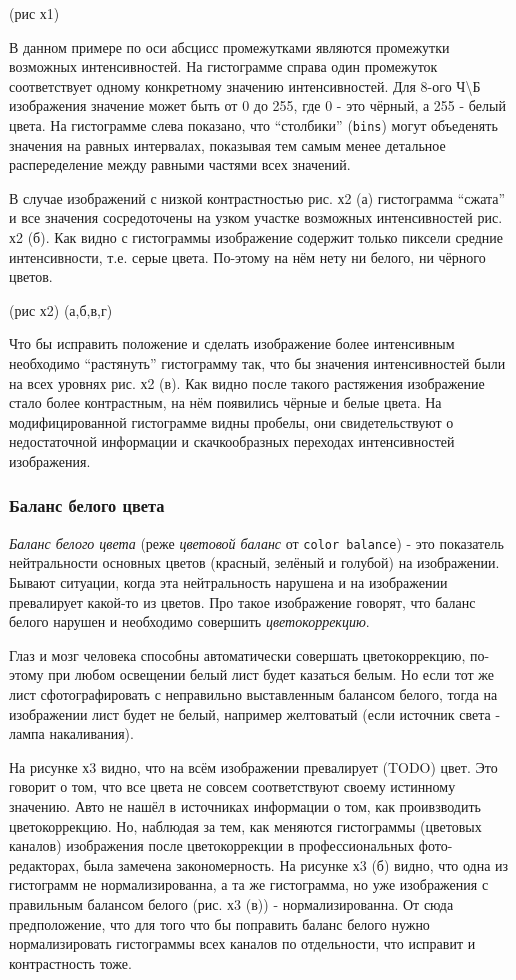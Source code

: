 \documentclass[12pt]{report}
\begin{document}
(рис х1)

В данном примере по оси абсцисс промежутками являются промежутки возможных интенсивностей. На гистограмме справа один промежуток соответствует одному конкретному значению интенсивностей. Для 8-ого Ч\textbackslash{}Б изображения значение может быть от 0 до 255, где 0 - это чёрный, а 255 - белый цвета. На гистограмме слева показано, что ``столбики'' (\texttt{bins}) могут объеденять значения на равных интервалах, показывая тем самым менее детальное распеределение между равными частями всех значений.

В случае изображений с низкой контрастностью рис. х2 (а) гистограмма ``сжата'' и все значения сосредоточены на узком участке возможных интенсивностей рис. х2 (б). Как видно с гистограммы изображение содержит только пиксели средние интенсивности, т.е. серые цвета. По-этому на нём нету ни белого, ни чёрного цветов.

(рис х2) (а,б,в,г)

Что бы исправить положение и сделать изображение более интенсивным необходимо ``растянуть'' гистограмму так, что бы значения интенсивностей были на всех уровнях рис. х2 (в). Как видно после такого растяжения изображение стало более контрастным, на нём появились чёрные и белые цвета. На модифицированной гистограмме видны пробелы, они свидетельствуют о недостаточной информации и скачкообразных переходах интенсивностей изображения.

\subsubsection{Баланс белого цвета}

\emph{Баланс белого цвета} (реже \emph{цветовой баланс} от \texttt{color balance}) - это показатель нейтральности основных цветов (красный, зелёный и голубой) на изображении. Бывают ситуации, когда эта нейтральность нарушена и на изображении превалирует какой-то из цветов. Про такое изображение говорят, что баланс белого нарушен и необходимо совершить \emph{цветокоррекцию}. 

Глаз и мозг человека способны автоматически совершать цветокоррекцию, по-этому при любом освещении белый лист будет казаться белым. Но если тот же лист сфотографировать с неправильно выставленным балансом белого, тогда на изображении лист будет не белый, например желтоватый (если источник света - лампа накаливания).

На рисунке х3 видно, что на всём изображении превалирует (TODO) цвет. Это говорит о том, что все цвета не совсем соответствуют своему истинному значению. Авто не нашёл  в источниках информации о том, как проивзводить цветокоррекцию. Но, наблюдая за тем, как меняются гистограммы (цветовых каналов) изображения после цветокоррекции в профессиональных фото-редакторах, была замечена закономерность. На рисунке х3 (б) видно, что одна из гистограмм не нормализированна, а та же гистограмма, но уже изображения с правильным балансом белого (рис. х3 (в)) - нормализированна. От сюда предположение, что для того что бы поправить баланс белого нужно нормализировать гистограммы всех каналов по отдельности, что исправит и контрастность тоже.
\end{document}
